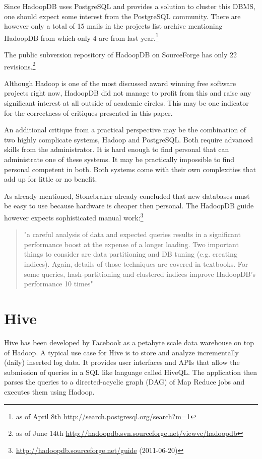 \documentclass[12pt,a4paper]{scrartcl}		%
\newcommand{\citeurl}[2]{\url{#1} (#2)}
\begin{document}
Since HadoopDB uses PostgreSQL and provides a solution to cluster this DBMS, one should expect some interest from the PostgreSQL community. There are however only a total of 15 mails in the projects list archive mentioning HadoopDB from which only 4 are from last year.\footnote{as of April 8th \url{http://search.postgresql.org/search?m=1}}

The public subversion repository of HadoopDB on SourceForge has only 22 revisions.\footnote{as of June 14th \url{http://hadoopdb.svn.sourceforge.net/viewvc/hadoopdb}}

Although Hadoop is one of the most discussed award winning free software projects right now, HadoopDB did not manage to profit from this and raise any significant interest at all outside of academic circles. This may be one indicator for the correctness of critiques presented in this paper.

An additional critique from a practical perspective may be the combination of two highly complicate systems, Hadoop and PostgreSQL. Both require advanced skills from the administrator. It is hard enough to find personal that can administrate one of these systems. It may be practically impossible to find personal competent in both. Both systems come with their own complexities that add up for little or no benefit.

As already mentioned, Stonebraker already concluded that new databases must be easy to use because hardware is cheaper then personal. The HadoopDB guide however expects sophisticated manual work:\footnote{\citeurl{http://hadoopdb.sourceforge.net/guide}{2011-06-20}}
\begin{quote}
"a careful analysis of data and expected queries results in a significant performance boost at the expense of a longer loading. Two important things to consider are data partitioning and DB tuning (e.g. creating indices). Again, details of those techniques are covered in textbooks. For some queries, hash-partitioning and clustered indices improve HadoopDB's performance 10 times"  
\end{quote}

\section{Hive}

Hive has been developed by Facebook as a petabyte scale data warehouse on top of Hadoop. \cite{Thusoo_hive-a} A typical use case for Hive is to store and analyze incrementally (daily) inserted log data. It provides user interfaces and APIs that allow the submission of queries in a SQL like language called HiveQL. The application then parses the queries to a directed-acyclic graph (DAG) of Map Reduce jobs and executes them using Hadoop.
\end{document}
